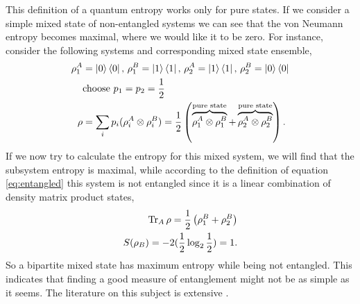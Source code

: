 This definition of a quantum entropy works only for pure states. If we consider a simple mixed state of non-entangled systems we can see that the von Neumann entropy becomes maximal, where we would like it to be zero. For instance, consider the following systems and corresponding mixed state ensemble,
\begin{align*}
    \rho^A_1 &= \ket{0} \bra{0} \text{, } \rho^B_1 = \ket{1} \bra{1} \text{, } \rho^A_2 = \ket{1} \bra{1} \text{, }
    \rho^B_2 = \ket{0} \bra{0}\\
    &\text{choose $p_1=p_2=\frac{1}{2}$}\\
    \rho &= \sum_i p_i (\rho^A_i \otimes \rho^B_i) = \frac{1}{2} \left( \overbrace{\rho^A_1 \otimes \rho^B_1}^{\text{pure state}} + \overbrace{\rho^A_2 \otimes \rho^B_2}^{\text{pure state}}\right).
\end{align*}
If we now try to calculate the entropy for this mixed system, we will find that the subsystem entropy is maximal, while according to the definition of equation \ref{eq:entangled} this system is not entangled since it is a linear combination of density matrix product states,
\begin{align*}
    \Tr_A{\rho} = \frac{1}{2} \left( \rho^B_1 + \rho^B_2 \right)\\
    S(\rho_B) = -2 (\frac{1}{2} \log_2{\frac{1}{2}}) = 1.
\end{align*}
So a bipartite mixed state has maximum entropy while being not entangled. This indicates that finding a good measure of entanglement might not be as simple as it seems. The literature on this subject is extensive \cite{Horodecki2009}.